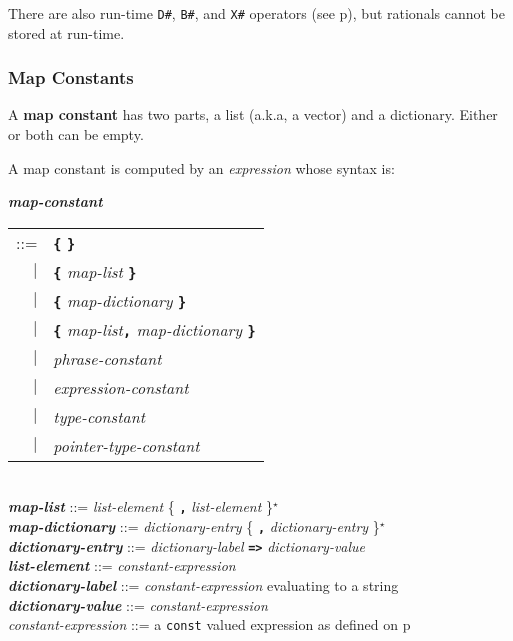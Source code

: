 \documentclass[12pt]{article}
\newcommand{\TT}[1]{{\tt \bfseries #1}}
\newcommand{\STAR}{{\Large $^\star$}}
\newcommand{\key}[1]{{\rm \bfseries #1}}
\newcommand{\emkey}[1]{{\em \bfseries #1}}
\newcommand{\pagref}[1]{p\pageref{#1}}
\newenvironment{indpar}[1][0.3in]%
	{\begin{list}{}%
		     {\setlength{\itemsep}{0in}%
		      \setlength{\topsep}{0in}%
		      \setlength{\parsep}{1ex}%
		      \setlength{\labelwidth}{#1}%
		      \setlength{\leftmargin}{#1}%
		      \addtolength{\leftmargin}{\labelsep}}%
	 \item}%
	{\end{list}}
\begin{document}
There are also run-time {\tt D\#}, {\tt B\#}, and {\tt X\#}
operators (see \pagref{RUN-TIME-STRING-TO-NUMBER-CONVERSIONS}),
but rationals cannot be stored at run-time.

\subsubsection{Map Constants}
\label{MAP-CONSTANTS}

A \key{map constant} has two parts, a list (a.k.a, a vector) and a dictionary.
Either or both can be empty.

A map constant is computed by an {\em expression} whose syntax is:

\begin{indpar}
\emkey{map-constant}\label{MAP-CONSTANT}
    \begin{tabular}[t]{rl}
    ::= & \TT{\{} \TT{\}} \\
    $|$ & \TT{\{} {\em map-list} \TT{\}} \\
    $|$ & \TT{\{} {\em map-dictionary} \TT{\}} \\
    $|$ & \TT{\{} {\em map-list}\TT{,} {\em map-dictionary} \TT{\}} \\
    $|$ & {\em phrase-constant} \\
    $|$ & {\em expression-constant} \\
    $|$ & {\em type-constant} \\
    $|$ & {\em pointer-type-constant} \\
    \end{tabular}
\\[0.5ex]
\emkey{map-list} ::= {\em list-element} \{ \TT{,} {\em list-element} \}\STAR{}
\\[0.5ex]
\emkey{map-dictionary} ::= {\em dictionary-entry}
                              \{ \TT{,} {\em dictionary-entry} \}\STAR{}
\\[0.5ex]
\emkey{dictionary-entry} ::=
    {\em dictionary-label} \TT{=>} {\em dictionary-value}
\\[0.5ex]
\emkey{list-element}\label{LIST-ELEMENT} ::= {\em constant-expression}
\\[0.5ex]
\emkey{dictionary-label}\label{DICTIONARY-LABEL}
    ::= {\em constant-expression} evaluating to a string
\\[0.5ex]
\emkey{dictionary-value}\label{DICTIONARY-VALUE}
    ::= {\em constant-expression}
\\[0.5ex]
{\em constant-expression} ::= a {\tt const} valued expression as
    defined on \pagref{CONSTANT-EXPRESSION}

\end{indpar}
\end{document}
